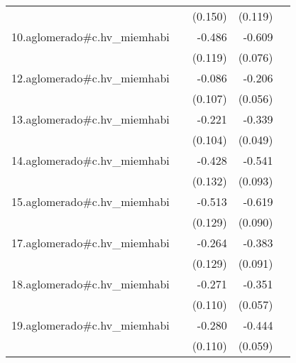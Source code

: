 {\begin{longtable}{l*{4}{D{.}{.}{-1}}}
            &                     &     (0.150)         &     (0.119)         &                     \\
\addlinespace
10.aglomerado#c.hv\_miemhabi&                     &      -0.486\sym{***}&      -0.609\sym{***}&                     \\
            &                     &     (0.119)         &     (0.076)         &                     \\
\addlinespace
12.aglomerado#c.hv\_miemhabi&                     &      -0.086         &      -0.206\sym{***}&                     \\
            &                     &     (0.107)         &     (0.056)         &                     \\
\addlinespace
13.aglomerado#c.hv\_miemhabi&                     &      -0.221\sym{*}  &      -0.339\sym{***}&                     \\
            &                     &     (0.104)         &     (0.049)         &                     \\
\addlinespace
14.aglomerado#c.hv\_miemhabi&                     &      -0.428\sym{**} &      -0.541\sym{***}&                     \\
            &                     &     (0.132)         &     (0.093)         &                     \\
\addlinespace
15.aglomerado#c.hv\_miemhabi&                     &      -0.513\sym{***}&      -0.619\sym{***}&                     \\
            &                     &     (0.129)         &     (0.090)         &                     \\
\addlinespace
17.aglomerado#c.hv\_miemhabi&                     &      -0.264\sym{*}  &      -0.383\sym{***}&                     \\
            &                     &     (0.129)         &     (0.091)         &                     \\
\addlinespace
18.aglomerado#c.hv\_miemhabi&                     &      -0.271\sym{*}  &      -0.351\sym{***}&                     \\
            &                     &     (0.110)         &     (0.057)         &                     \\
\addlinespace
19.aglomerado#c.hv\_miemhabi&                     &      -0.280\sym{*}  &      -0.444\sym{***}&                     \\
            &                     &     (0.110)         &     (0.059)         &                     \\

\end{longtable}}
